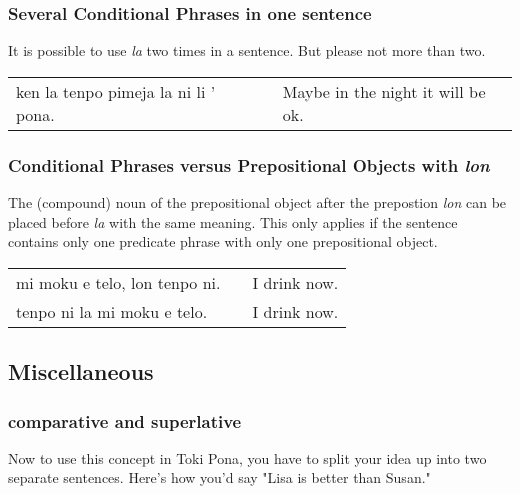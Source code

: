 \subsubsection*{Several Conditional Phrases in one sentence}
%
It is possible to use \textit{la} two times in a sentence. 
But please not more than two. 

\begin{supertabular}{p{5,5cm}|ll}
ken la tenpo pimeja la ni li ' pona. && Maybe in the night it will be ok. \\  
\end{supertabular} 

%
\subsubsection*{Conditional Phrases versus Prepositional Objects with \textit{lon} }
%
The (compound) noun of the prepositional object after the prepostion \textit{lon} can be placed before \textit{la} with the same meaning.
This only applies if the sentence contains only one predicate phrase with only one prepositional object. 

\begin{supertabular}{p{5,5cm}|ll}
mi moku e telo, lon tenpo ni. && I drink now. \\
tenpo ni la mi moku e telo.  && I drink now. \\
\end{supertabular} 

%
\subsection*{Miscellaneous}
\subsubsection*{comparative and superlative} 
%
Now to use this concept in Toki Pona, you have to split your idea up into two separate sentences. 
Here's how you'd say "Lisa is better than Susan."

